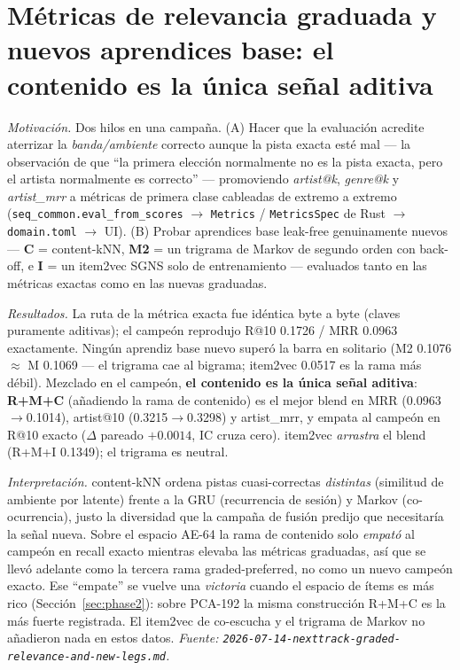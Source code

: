 \documentclass[11pt]{article}
\begin{document}
\section{Métricas de relevancia graduada y nuevos aprendices base: el contenido es la única señal aditiva}
\label{sec:graded}
\emph{Motivación.} Dos hilos en una campaña. (A) Hacer que la evaluación
acredite aterrizar la \emph{banda/ambiente} correcto aunque la pista exacta esté
mal --- la observación de que ``la primera elección normalmente no es la pista
exacta, pero el artista normalmente es correcto'' --- promoviendo
\emph{artist@k}, \emph{genre@k} y \emph{artist\_mrr} a métricas de primera clase
cableadas de extremo a extremo (\texttt{seq\_common.eval\_from\_scores} $\to$
\texttt{Metrics} / \texttt{MetricsSpec} de Rust $\to$ \texttt{domain.toml} $\to$
UI). (B) Probar aprendices base leak-free genuinamente nuevos --- \textbf{C} =
content-kNN, \textbf{M2} = un trigrama de Markov de segundo orden con back-off,
e \textbf{I} = un item2vec SGNS solo de entrenamiento --- evaluados tanto en las
métricas exactas como en las nuevas graduadas.

\emph{Resultados.} La ruta de la métrica exacta fue idéntica byte a byte (claves
puramente aditivas); el campeón reprodujo R@10 \num{0.1726} / MRR \num{0.0963}
exactamente. Ningún aprendiz base nuevo superó la barra en solitario (M2
\num{0.1076} $\approx$ M \num{0.1069} --- el trigrama cae al bigrama; item2vec
\num{0.0517} es la rama más débil). Mezclado en el campeón, \textbf{el contenido
es la única señal aditiva}: \textbf{R+M+C} (añadiendo la rama de contenido) es el
mejor blend en MRR (\num{0.0963}$\to$\num{0.1014}), artist@10
(\num{0.3215}$\to$\num{0.3298}) y artist\_mrr, y empata al campeón en R@10 exacto
($\Delta$ pareado $+\num{0.0014}$, IC cruza cero). item2vec \emph{arrastra} el
blend (R+M+I \num{0.1349}); el trigrama es neutral.

\emph{Interpretación.} content-kNN ordena pistas cuasi-correctas
\emph{distintas} (similitud de ambiente por latente) frente a la GRU
(recurrencia de sesión) y Markov (co-ocurrencia), justo la diversidad que la
campaña de fusión predijo que necesitaría la señal nueva. Sobre el espacio AE-64
la rama de contenido solo \emph{empató} al campeón en recall exacto mientras
elevaba las métricas graduadas, así que se llevó adelante como la tercera rama
graded-preferred, no como un nuevo campeón exacto. Ese ``empate'' se vuelve una
\emph{victoria} cuando el espacio de ítems es más rico (Sección~\ref{sec:phase2}):
sobre PCA-192 la misma construcción R+M+C es la más fuerte registrada. El
item2vec de co-escucha y el trigrama de Markov no añadieron nada en estos datos.
\emph{Fuente: \texttt{2026-07-14-nexttrack-graded-relevance-and-new-legs.md}.}
\end{document}

